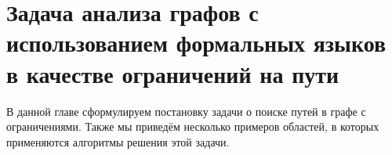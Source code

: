 \setchapterpreamble[u]{\margintoc}
\chapter[Пути с ограничениями в терминах формальных языков]{Задача анализа графов с использованием формальных языков в качестве ограничений на пути}
\label{chpt:FLPQ}


В данной главе сформулируем постановку задачи о поиске путей в графе с ограничениями.
Также мы приведём несколько примеров областей, в которых применяются алгоритмы решения этой задачи.








